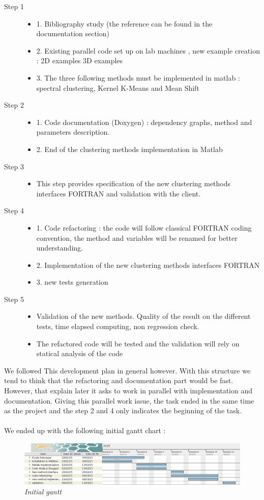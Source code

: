 \begin{description}
\item[Step 1]
	\begin{itemize}
	\item 1. Bibliography study (the reference can be found in the documentation section)
 	\item 2. Existing parallel code set up on lab machines , new example creation : 2D examples 3D examples
	\item 3. The three following methods must be implemented in matlab : spectral clustering, Kernel K-Means and Mean Shift        
	\end{itemize} 
\item[Step 2]
	\begin{itemize}
	\item 1. Code documentation (Doxygen) : dependency graphs, method and parameters description.
	\item 2. End of the clustering methods implementation in Matlab
	\end{itemize}
\item[Step 3]
	\begin{itemize}
	\item This step provides specification of the new clustering methods interfaces FORTRAN and validation with the client.
	\end{itemize}
\item[Step 4]
	\begin{itemize}
	\item 1. Code refactoring : the code will follow classical FORTRAN coding convention, the method and variables will be renamed for better understanding.
	\item 2. Implementation of the new clustering methods interfaces FORTRAN
	\item 3. new tests generation
	\end{itemize}
\item[Step 5]
	\begin{itemize}
	\item Validation of the new methods. Quality of the result on the different tests, time elapsed computing, non regression check.
	\item The refactored code will be tested and the validation will rely on statical analysis of the code
	\end{itemize}
\end{description}


We followed This development plan in general however. With this structure we tend to think that the refactoring and documentation part would be fast. However, that explain later it asks to work in parallel with implementation and documentation. Giving this parallel work issue, the task ended in the same time as the project and the step 2 and 4 only indicates the beginning of the task.
 \\
 \\
 
  
 We ended up with the following initial gantt chart :
 
 \begin{figure}[h!]
\includegraphics[width=1\textwidth]{Image/gantt.png}\centering
\caption{\textit{Initial gantt}}
\end{figure}
